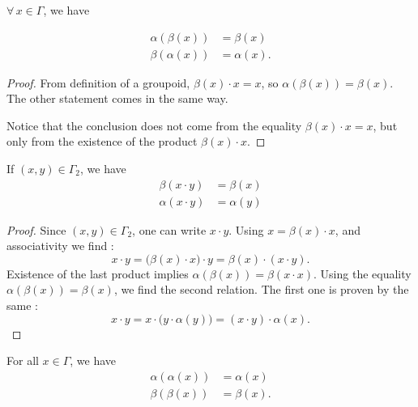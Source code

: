 \begin{lemma}
$\forall\,x\in\Gamma$, we have 

\begin{subequations}
\begin{align}
\alpha(\beta(x))&=\beta(x)\\
\beta(\alpha(x))&=\alpha(x).
\end{align}
\end{subequations}
\end{lemma}

\begin{proof}
From definition of a groupoid, $\beta(x)\cdot x=x$, so $\alpha(\beta(x))=\beta(x)$. The other statement comes in the same way.

Notice that the conclusion does not come from the equality $\beta(x)\cdot x=x$, but only from the existence of the product $\beta(x)\cdot x$.
\end{proof}

\begin{lemma}
If $(x,y)\in\Gamma_{2}$, we have
\begin{subequations}
\begin{align}
\beta(x\cdot y)&=\beta(x)\\
\alpha(x\cdot y)&=\alpha(y)
\end{align}
\end{subequations}

\end{lemma}

\begin{proof}
Since $(x,y)\in \Gamma_{2}$, one can write $x\cdot y$. Using $x=\beta(x)\cdot x$, and associativity we find :
\[ 
  x\cdot y=\big( \beta(x)\cdot x \big)\cdot y=\beta(x)\cdot(x\cdot y).	
\]
Existence of the last product implies $\alpha(\beta(x))=\beta(x\cdot x)$. Using the equality $\alpha(\beta(x))=\beta(x)$, we find the second relation. The first one is proven by the same :
\[ 
  x\cdot y=x\cdot \big( y\cdot\alpha(y) \big)=(x\cdot y)\cdot \alpha(x).
\]

\end{proof}

\begin{lemma}
For all $x\in\Gamma$, we have
\begin{subequations}
\begin{align}
  \alpha(\alpha(x))&=\alpha(x)\\
\beta(\beta(x))&=\beta(x).
\end{align}
\end{subequations}
\end{lemma}

